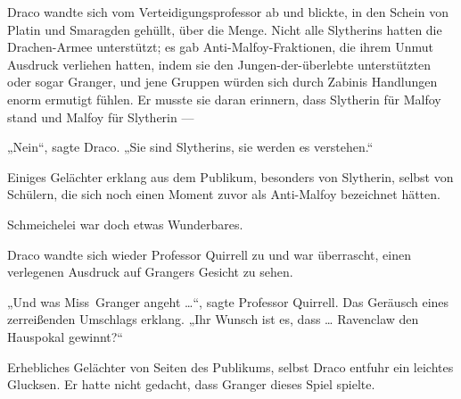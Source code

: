 Draco wandte sich vom Verteidigungsprofessor ab und blickte, in den Schein von Platin und Smaragden gehüllt, über die Menge. Nicht alle Slytherins hatten die Drachen-Armee unterstützt; es gab Anti-Malfoy-Fraktionen, die ihrem Unmut Ausdruck verliehen hatten, indem sie den Jungen-der-überlebte unterstützten oder sogar Granger, und jene Gruppen würden sich durch Zabinis Handlungen enorm ermutigt fühlen. Er musste sie daran erinnern, dass Slytherin für Malfoy stand und Malfoy für Slytherin —

„Nein“, sagte Draco.
„Sie sind Slytherins, sie werden es verstehen.“

Einiges Gelächter erklang aus dem Publikum, besonders von Slytherin, selbst von Schülern, die sich noch einen Moment zuvor als Anti-Malfoy bezeichnet hätten.

Schmeichelei war doch etwas Wunderbares.

Draco wandte sich wieder Professor Quirrell zu und war überrascht, einen verlegenen Ausdruck auf Grangers Gesicht zu sehen.

„Und was Miss~Granger angeht …“, sagte Professor Quirrell. Das Geräusch eines zerreißenden Umschlags erklang.
„Ihr Wunsch ist es, dass … Ravenclaw den Hauspokal gewinnt?“

Erhebliches Gelächter von Seiten des Publikums, selbst Draco entfuhr ein leichtes Glucksen. Er hatte nicht gedacht, dass Granger dieses Spiel spielte.

